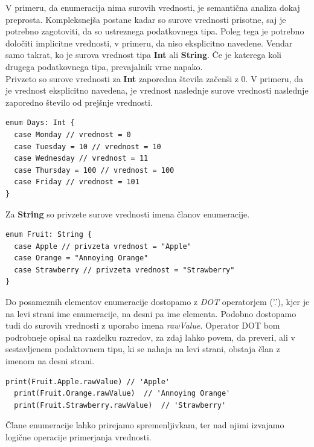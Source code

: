 \documentclass[a4paper, 12pt]{book}
\begin{document}
V primeru, da enumeracija nima surovih vrednosti, je semantična analiza dokaj preprosta. Kompleksnejša postane kadar so surove vrednosti prisotne, saj je potrebno zagotoviti, da so ustreznega podatkovnega tipa. Poleg tega je potrebno določiti implicitne vrednosti, v primeru, da niso eksplicitno navedene. Vendar samo takrat, ko je surova vrednost tipa \textbf{Int} ali \textbf{String}. Če je katerega koli drugega podatkovnega tipa, prevajalnik vrne napako. \\
\indent Privzeto so surove vrednosti za \textbf{Int} zaporedna števila začenši z 0. V primeru, da je vrednost eksplicitno navedena, je vrednost naslednje surove vrednosti naslednje zaporedno število od prejšnje vrednosti.

\begin{lstlisting}[caption={Enumeracija s surovimi vrednostmi tipa Int}, captionpos=b]
enum Days: Int {
  case Monday // vrednost = 0
  case Tuesday = 10 // vrednost = 10
  case Wednesday // vrednost = 11
  case Thursday = 100 // vrednost = 100
  case Friday // vrednost = 101
}
\end{lstlisting}

\indent Za \textbf{String} so privzete surove vrednosti imena članov enumeracije.

\begin{lstlisting}[caption={Enumeracija s surovimi vrednostmi tipa String}, captionpos=b, label={lst:fruitEnumeration}]
enum Fruit: String {
  case Apple // privzeta vrednost = "Apple"
  case Orange = "Annoying Orange"
  case Strawberry // privzeta vrednost = "Strawberry"
}
\end{lstlisting}

Do posameznih elementov enumeracije dostopamo z \textit{DOT} operatorjem ('.'), kjer je na levi strani ime enumeracije, na desni pa ime elementa. Podobno dostopamo tudi do surovih vrednosti z uporabo imena \textit{rawValue}. Operator DOT bom podrobneje opisal na razdelku razredov, za zdaj lahko povem, da preveri, ali v sestavljenem podaktovnem tipu, ki se nahaja na levi strani, obstaja član z imenom na desni strani.

\begin{lstlisting}[caption={Primer dostopa do elementov enumeracije ~\ref{lst:fruitEnumeration}}, captionpos=b]
  print(Fruit.Apple.rawValue) // 'Apple'
  print(Fruit.Orange.rawValue)  // 'Annoying Orange'
  print(Fruit.Strawberry.rawValue)  // 'Strawberry'
\end{lstlisting}

Člane enumeracije lahko prirejamo spremenljivkam, ter nad njimi izvajamo logične operacije primerjanja vrednosti. 
\end{document}
